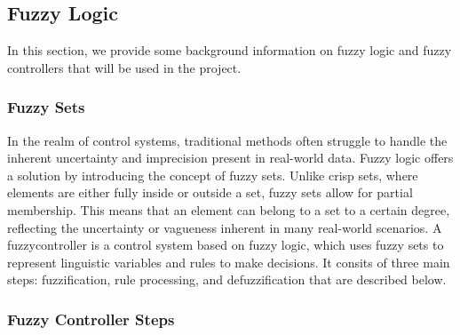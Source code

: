 \documentclass[12pt, titlepage]{article}
\begin{document}
\subsection{Fuzzy Logic}
In this section, we provide some background information on fuzzy logic and 
fuzzy controllers that will be used in the \progname{} project.

\subsubsection{Fuzzy Sets}
In the realm of control systems, traditional methods often struggle 
to handle the inherent uncertainty and imprecision present in real-world data. 
Fuzzy logic offers a solution by introducing the concept of fuzzy sets. 
Unlike crisp sets, where elements are either fully inside or outside a set, 
fuzzy sets allow for partial membership. This means that an element can 
belong to a set to a certain degree, reflecting the uncertainty or 
vagueness inherent in many real-world scenarios. A fuzzycontroller
is a control system based on fuzzy logic, which uses fuzzy sets to
represent linguistic variables and rules to make decisions.
It consits of three main steps: fuzzification, rule processing, and
defuzzification that are described below.

\subsubsection{Fuzzy Controller Steps}
\end{document}
